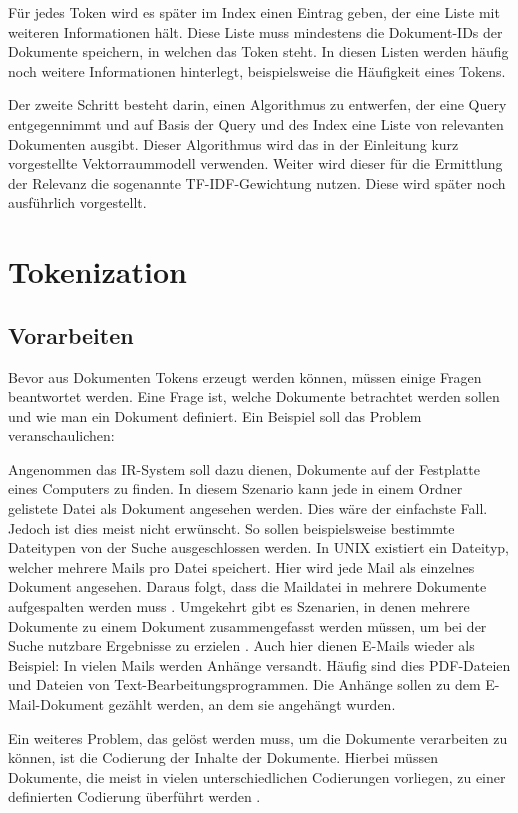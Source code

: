 Für jedes Token wird es später im Index einen Eintrag geben, der eine Liste mit weiteren Informationen hält. Diese Liste muss mindestens die Dokument-IDs der Dokumente speichern, in welchen das Token steht. In diesen Listen werden häufig noch weitere Informationen hinterlegt, beispielsweise die Häufigkeit eines Tokens.

Der zweite Schritt besteht darin, einen Algorithmus zu entwerfen, der eine Query entgegennimmt und auf Basis der Query und des Index eine Liste von relevanten Dokumenten ausgibt. Dieser Algorithmus wird das in der Einleitung kurz vorgestellte Vektorraummodell verwenden. Weiter wird dieser für die Ermittlung der Relevanz die sogenannte TF-IDF-Gewichtung nutzen. Diese wird später noch ausführlich vorgestellt.

\section{Tokenization}\label{token}
\subsection{Vorarbeiten}
Bevor aus Dokumenten Tokens erzeugt werden können, müssen einige Fragen beantwortet werden.
Eine Frage ist, welche Dokumente betrachtet werden sollen und wie man ein Dokument definiert. Ein Beispiel soll das Problem veranschaulichen:

Angenommen das IR-System soll dazu dienen, Dokumente auf der Festplatte eines Computers zu finden. In diesem Szenario kann jede in einem Ordner gelistete Datei als Dokument angesehen werden. Dies wäre der einfachste Fall. Jedoch ist dies meist nicht erwünscht. So sollen beispielsweise bestimmte Dateitypen von der Suche ausgeschlossen werden. In UNIX existiert ein Dateityp, welcher mehrere Mails pro Datei speichert. Hier wird jede Mail als einzelnes Dokument angesehen. Daraus folgt, dass die Maildatei in mehrere Dokumente aufgespalten werden muss \cite{IR_Intro_Cambridge}.
Umgekehrt gibt es Szenarien, in denen mehrere Dokumente zu einem Dokument zusammengefasst werden müssen, um bei der Suche nutzbare Ergebnisse zu erzielen \cite{IR_Intro_Cambridge}. Auch hier dienen E-Mails wieder als Beispiel: In vielen Mails werden Anhänge versandt. Häufig sind dies PDF-Dateien und Dateien von Text-Bearbeitungsprogrammen. Die Anhänge sollen zu dem E-Mail-Dokument gezählt werden, an dem sie angehängt wurden.

Ein weiteres Problem, das gelöst werden muss, um die Dokumente verarbeiten zu können, ist die Codierung der Inhalte der Dokumente. Hierbei müssen Dokumente, die meist in vielen unterschiedlichen Codierungen vorliegen, zu einer definierten Codierung überführt werden \cite{IR_Intro_Cambridge}.


